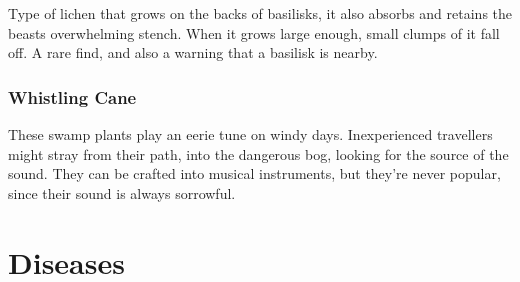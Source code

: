 \begin{multicols}{2}
Type of lichen that grows on the backs of basilisks, it also absorbs and retains the beasts overwhelming stench. When it grows large 
enough, small clumps of it fall off. A rare find, and also a warning that a basilisk is nearby.

\subsubsection{Whistling Cane}
\label{whistlingCane}

These swamp plants play an eerie tune on windy days. Inexperienced travellers might stray from their path, into the dangerous bog, 
looking for the source of the sound. They can be crafted into musical instruments, but they're never popular, since their sound is 
always sorrowful.

\end{multicols}

\section{Diseases}
\label{diseases}

\newcommand\newDisease[1]{
  \subsubsection{#1}
  \index{#1 (Disease)}
  \label{#1}
}

